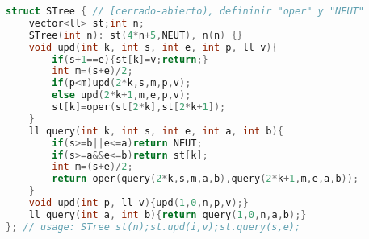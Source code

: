\begin{lstlisting}[language=C++]
struct STree { // [cerrado-abierto), defininir "oper" y "NEUT"
    vector<ll> st;int n;
    STree(int n): st(4*n+5,NEUT), n(n) {}
    void upd(int k, int s, int e, int p, ll v){
        if(s+1==e){st[k]=v;return;}
        int m=(s+e)/2;
        if(p<m)upd(2*k,s,m,p,v);
        else upd(2*k+1,m,e,p,v);
        st[k]=oper(st[2*k],st[2*k+1]);
    }
    ll query(int k, int s, int e, int a, int b){
        if(s>=b||e<=a)return NEUT;
        if(s>=a&&e<=b)return st[k];
        int m=(s+e)/2;
        return oper(query(2*k,s,m,a,b),query(2*k+1,m,e,a,b));
    }
    void upd(int p, ll v){upd(1,0,n,p,v);}
    ll query(int a, int b){return query(1,0,n,a,b);}
}; // usage: STree st(n);st.upd(i,v);st.query(s,e);
\end{lstlisting}